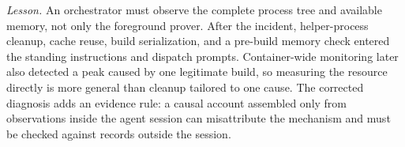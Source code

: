 \emph{Lesson.}
An orchestrator must observe the complete process tree and available
memory, not only the foreground prover. After the incident, helper-process
cleanup, cache reuse, build serialization, and a pre-build memory check
entered the standing instructions and dispatch prompts. Container-wide
monitoring later also detected a peak caused by one legitimate build, so
measuring the resource directly is more general than cleanup tailored to
one cause. The corrected diagnosis adds an evidence rule: a causal account
assembled only from observations inside the agent session can
misattribute the mechanism and must be checked against records outside
the session.
